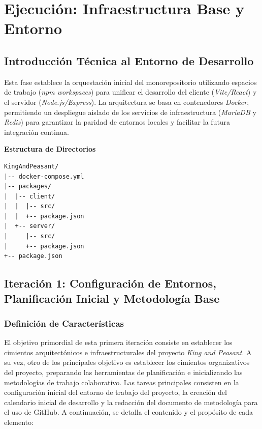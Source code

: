 \part{Ejecución: Infraestructura Base y Entorno}

\chapter{Introducción Técnica al Entorno de Desarrollo}

Esta fase establece la orquestación inicial del monorepositorio utilizando espacios de trabajo (\textit{npm workspaces}) para unificar el desarrollo del cliente (\textit{Vite/React}) y el servidor (\textit{Node.js/Express}). La arquitectura se basa en contenedores \textit{Docker}, permitiendo un despliegue aislado de los servicios de infraestructura (\textit{MariaDB} y \textit{Redis}) para garantizar la paridad de entornos locales y facilitar la futura integración continua.

\textbf{Estructura de Directorios} \\
\begin{verbatim}
KingAndPeasant/
|-- docker-compose.yml
|-- packages/
|  |-- client/
|  |  |-- src/
|  |  +-- package.json
|  +-- server/
|     |-- src/
|     +-- package.json
+-- package.json
\end{verbatim}

\chapter[Iteración 1: Configuración de Entornos y Metodología]{Iteración 1: Configuración de Entornos, Planificación Inicial y Metodología Base}

\section{Definición de Características}
El objetivo primordial de esta primera iteración consiste en establecer los cimientos arquitectónicos e infraestructurales del proyecto \textit{King and Peasant}. A su vez, otro de los principales objetivo es establecer los cimientos organizativos del proyecto, preparando las herramientas de planificación e inicializando las metodologías de trabajo colaborativo. Las tareas principales consisten en la configuración inicial del entorno de trabajo del proyecto, la creación del calendario inicial de desarrollo y la redacción del documento de metodología para el uso de GitHub. A continuación, se detalla el contenido y el propósito de cada elemento:

